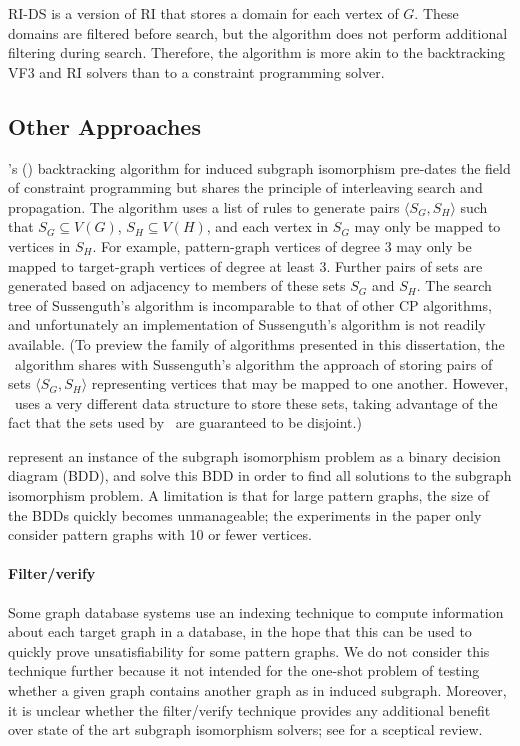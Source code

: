 RI-DS \citep{DBLP:journals/bmcbi/BonniciGPSF13} is a version of RI that
stores a domain for each vertex of $G$. These domains are filtered before search,
but the algorithm does not perform additional filtering during search.  Therefore,
the algorithm is more akin to the backtracking VF3 and RI solvers than to a
constraint programming solver.

\subsection{Other Approaches}\label{subsec:other-approaches-sip}

\citeauthor{sussenguth1965graph}'s (\citeyear{sussenguth1965graph})
backtracking algorithm for induced subgraph
isomorphism pre-dates the field of constraint programming but shares the
principle of interleaving search and propagation.  The algorithm uses
a list of rules to generate
pairs $\langle S_G, S_H \rangle$ such that $S_G \subseteq V(G)$, $S_H \subseteq
V(H)$, and each vertex in $S_G$ may only be mapped to vertices in $S_H$.
For example, pattern-graph vertices of degree 3 may only be mapped to
target-graph vertices of degree at least 3.
Further pairs of sets are generated based on adjacency to
members of these sets $S_G$ and $S_H$.
The search tree of Sussenguth's algorithm is incomparable to that of
other CP algorithms, and unfortunately an implementation of Sussenguth's
algorithm is not readily available.
(To preview the family of algorithms
presented in this dissertation, the \McSplit\ algorithm shares with
Sussenguth's algorithm the approach of storing pairs of sets $\langle S_G, S_H
\rangle$ representing vertices that may be mapped to one another. However,
\McSplit\ uses a very different data structure to store these sets, taking
advantage of the fact that the sets used by \McSplit\ are guaranteed to be
disjoint.)

\citet{DBLP:conf/RelMiCS/CortadellaV00} represent an instance of the subgraph
isomorphism problem as a binary decision diagram (BDD), and solve this BDD
in order to find all solutions to the subgraph isomorphism problem.  A limitation
is that for large
pattern graphs, the size of the BDDs quickly becomes unmanageable; the experiments
in the paper only consider pattern graphs with 10 or fewer vertices.

\paragraph*{Filter/verify} Some graph database systems use an indexing
technique to compute information about each target graph in a database, in the
hope that this can be used to quickly prove unsatisfiability for some pattern
graphs.  We do not consider this technique further because it not intended for
the one-shot problem of testing whether a given graph contains another graph as
in induced subgraph.  Moreover, it is unclear whether the filter/verify
technique provides any additional benefit over state of the art subgraph
isomorphism solvers; see \citet{DBLP:journals/jair/McCreeshPST18} for a
sceptical review.

